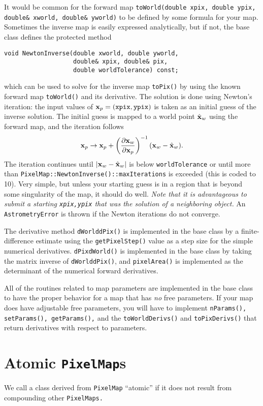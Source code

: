 \documentclass[11pt,preprint,flushrt]{aastex}
\begin{document}
It would be common for the forward map {\tt toWorld(double xpix, double ypix, double\& xworld, double\& yworld)} to be defined by some formula for your map.  Sometimes the inverse map is easily expressed analytically, but if not, the base class defines the protected method
\begin{verbatim}
void NewtonInverse(double xworld, double yworld, 
                   double& xpix, double& pix,
                   double worldTolerance) const;
\end{verbatim}
which can be used to solve for the inverse map {\tt toPix()} by using the known forward map {\tt toWorld()} and its derivative.  The solution is done using Newton's iteration: the input values of ${\bf x}_p={\tt (xpix,ypix)}$ is taken as an initial guess of the inverse solution.  The initial guess is mapped to a world point $\hat {\bf x}_w$ using the forward map, and the iteration follows
\begin{equation}
{\bf x}_p \rightarrow {\bf x}_p + \left( \frac{\partial {\bf x}_w}{\partial {\bf x}_p}\right)^{-1} ({\bf x}_w - \hat{\bf x}_w).
\end{equation}
The iteration continues until $|{\bf x}_w - \hat{\bf x}_w|$ is below {\tt worldTolerance} or until more than {\tt PixelMap::NewtonInverse()::maxIterations} is exceeded (this is coded to 10).  Very simple, but unless your starting guess is in a region that is beyond some singularity of the map, it should do well.  {\em Note that it is advantageous to submit a starting {\tt xpix,ypix} that was the solution of a neighboring object.}  An {\tt AstrometryError} is thrown if the Newton iterations do not converge.

The derivative method {\tt dWorlddPix()} is implemented in the base class by a finite-difference estimate using the {\tt getPixelStep()} value as a step size for the simple numerical derivatives.  {\tt dPixdWorld()} is implemented in the base class by taking the matrix inverse of {\tt dWorlddPix()},  and {\tt pixelArea()} is implemented as the determinant of the numerical forward derivatives.

All of the routines related to map parameters are implemented in the base class to have the proper behavior for a map that has {\em no} free parameters.  If your map does have adjustable free parameters, you will have to implement {\tt nParams(), setParams(), getParams(),} and the {\tt toWorldDerivs()} and {\tt toPixDerivs()} that return derivatives with respect to parameters.

\section{Atomic {\tt PixelMap}s}
We call a class derived from {\tt PixelMap} ``atomic'' if it does not result from compounding other {\tt PixelMaps.}  
\end{document}
